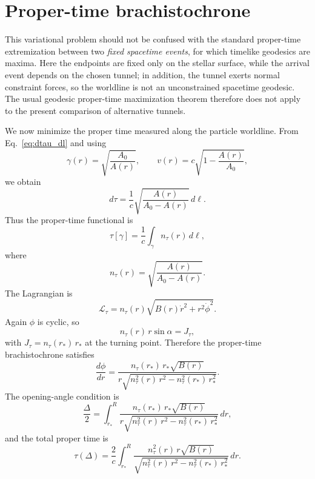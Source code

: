 \documentclass[
  aps,
  prd,
  twocolumn,
  nofootinbib,
  superscriptaddress,
  longbibliography
]{revtex4-2}
\begin{document}
\section{Proper-time brachistochrone}

This variational problem should not be confused with the standard
proper-time extremization between two \emph{fixed spacetime events},
for which timelike geodesics are maxima. Here the endpoints are fixed
only on the stellar surface, while the arrival event depends on the
chosen tunnel; in addition, the tunnel exerts normal constraint forces,
so the worldline is not an unconstrained spacetime geodesic. The usual
geodesic proper-time maximization theorem therefore does not apply to
the present comparison of alternative tunnels.

We now minimize the proper time measured along the particle worldline.
From Eq.~\eqref{eq:dtau_dl} and using
\begin{equation}
\gamma(r)=\sqrt{\frac{A_0}{A(r)}},
\qquad
v(r)=c\sqrt{1-\frac{A(r)}{A_0}},
\end{equation}
we obtain
\begin{equation}
d\tau
=
\frac{1}{c}
\sqrt{
\frac{A(r)}{A_0-A(r)}
}
\,d\ell.
\end{equation}
Thus the proper-time functional is
\begin{equation}
\tau[\gamma]
=
\frac{1}{c}
\int_\gamma
n_\tau(r)\,d\ell,
\label{eq:tau_functional}
\end{equation}
where
\begin{equation}
n_\tau(r)
=
\sqrt{
\frac{A(r)}{A_0-A(r)}
}.
\label{eq:ntau_def}
\end{equation}
The Lagrangian is
\begin{equation}
\mathcal{L}_\tau
=
n_\tau(r)
\sqrt{
B(r)\dot{r}^2+r^2\dot{\phi}^2
}.
\end{equation}
Again $\phi$ is cyclic, so
\begin{equation}
n_\tau(r)\,r\sin\alpha
=
J_\tau,
\label{eq:snell_tau}
\end{equation}
with $J_\tau = n_\tau(r_*)\,r_*$ at the turning point. Therefore
the proper-time brachistochrone satisfies
\begin{equation}
\frac{d\phi}{dr}
=
\frac{
n_\tau(r_*)\,r_*\sqrt{B(r)}
}{
r\sqrt{
n_\tau^2(r)\,r^2
-
n_\tau^2(r_*)\,r_*^2
}
}.
\label{eq:dphidr_tau}
\end{equation}
The opening-angle condition is
\begin{equation}
\frac{\Delta}{2}
=
\int_{r_*}^{R}
\frac{
n_\tau(r_*)\,r_*\sqrt{B(r)}
}{
r\sqrt{
n_\tau^2(r)\,r^2
-
n_\tau^2(r_*)\,r_*^2
}
}
\,dr,
\label{eq:opening_tau}
\end{equation}
and the total proper time is
\begin{equation}
\tau(\Delta)
=
\frac{2}{c}
\int_{r_*}^{R}
\frac{
n_\tau^2(r)\,r\sqrt{B(r)}
}{
\sqrt{
n_\tau^2(r)\,r^2
-
n_\tau^2(r_*)\,r_*^2
}
}
\,dr.
\label{eq:time_tau}
\end{equation}
\end{document}
